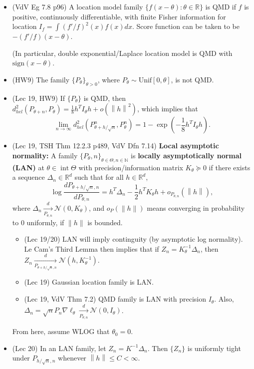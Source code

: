\documentclass[twoside]{article}
\newcommand{\dis}{\displaystyle}
\newcommand{\norm}[1]{\left\|{#1}\right\|} %
\newcommand\bbN{\mathbb{N}}
\newcommand\bbR{\mathbb{R}}
\newcommand\calN{\mathcal{N}}
\newcommand\Dlt{\Delta}
\def\t{\theta}
\newcommand\T{\Theta}
\newcommand\goesto{\rightarrow}
\begin{document}
\begin{itemize}
\item (VdV Eg 7.8 p96) A location model family $\{ f(x-\t): \t \in \bbR\}$ is QMD if $f$ is positive, continuously differentiable, with finite Fisher information for location $I_f = \int (f'/f)^2(x) f(x) dx$. Score function can be taken to be $-(f'/f)(x-\t)$.

(In particular, double exponential/Laplace location model is QMD with $\text{sign}(x-\t)$.

\item (HW9) The family $\{ P_\t\}_{\t > 0}$, where $P_\t \sim \text{Unif}[0,\t]$, is not QMD.

\item (Lec 19, HW9) If $\{P_\t\}$ is QMD, then $d_{hel}^2(P_{\t + n}, P_\t) = \dis\frac{1}{8}h^T I_\t h + o(\norm{h}^2)$, which implies that \[\dis\lim_{n \goesto \infty} d_{hel}^2(P_{\t + h/\sqrt{n}}^n, P_\t^n) = 1 - \exp \left(-\dis\frac{1}{8}h^T I_\t h \right).\]

\item (Lec 19, TSH Thm 12.2.3 p489, VdV Dfn 7.14) \textbf{Local asymptotic normality:} A family $\{ P_\t,n \}_{\t \in \T, n \in \bbN}$ is \textbf{locally asymptotically normal (LAN)} at $\t \in \operatorname{int} \T$ with precision/information matrix $K_\t \succeq 0$ if there exists a sequence $\Dlt_n \in \bbR^d$ such that for all $h \in \bbR^d$,
\[ \log \frac{dP_{\t + h/\sqrt{n}, n}}{dP_{\t, n}} = h^T \Dlt_n - \frac{1}{2} h^T K_\t h + o_{P_{\t, n}}(\norm{h}), \]
where $\Delta_n \xrightarrow[P_{\t,n}]{d} \calN(0, K_\t)$, and $o_P(\|h\|)$ means converging in probability to 0 uniformly, if $\|h\|$ is bounded.
\begin{itemize}
\item (Lec 19/20) LAN will imply continguity (by asymptotic log normality). Le Cam's Third Lemma then implies that if $Z_n = K_\t^{-1}\Dlt_n$, then $Z_n \xrightarrow[P_{\t + h/\sqrt{n}, n}]{d} \calN(h, K_\t^{-1})$.

\item (Lec 19) Gaussian location family is LAN.

\item (Lec 19, VdV Thm 7.2) QMD family is LAN with precision $I_\t$. Also, $\Dlt_n = \sqrt{n} P_n \nabla \ell_\t \xrightarrow[P_{\t, n}]{d} \calN(0, I_\t)$.
\end{itemize}

From here, assume WLOG that $\t_0 = 0$.

\item (Lec 20) In an LAN family, let $Z_n = K^{-1}\Dlt_n$. Then $\{Z_n\}$ is uniformly tight under $P_{h/\sqrt{n},n}$ whenever $\norm{h}\leq C < \infty$.


\end{itemize}
\end{document}
